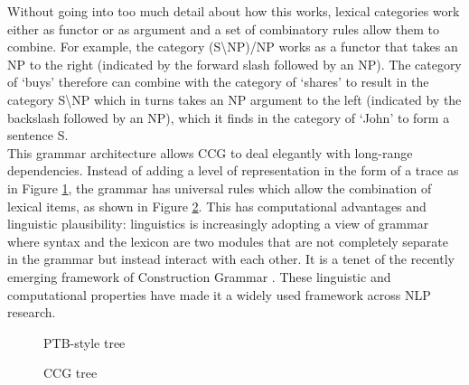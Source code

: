 \documentclass[output=paper]{LSP/langsci}
\begin{document}
\indent Without going into too much detail about how this works, lexical categories work either as functor or as argument and a set of combinatory rules allow them to combine. For example, the category (S\textbackslash NP)/NP works as a functor that takes an NP to the right (indicated by the forward slash followed by an NP). The category of `buys' therefore can combine with the category of `shares' to result in the category S\textbackslash NP which in turns takes an NP argument to the left (indicated by the backslash followed by an NP), which it finds in the category of `John' to form a sentence S.\\
\indent This grammar architecture allows CCG to deal elegantly with long-range dependencies. Instead of adding a level of representation in the form of a trace as in Figure \ref{fig:3}, the grammar has universal rules which allow the combination of lexical items, as shown in Figure \ref{fig:4}. This has computational advantages and linguistic plausibility: linguistics is increasingly adopting a view of grammar where syntax and the lexicon are two modules that are not completely separate in the grammar but instead interact with each other. It is a tenet of the recently emerging framework of Construction Grammar \citep{hoffmann2013}. These linguistic and computational properties have made it a widely used framework across NLP research.
\begin{figure}[H]
\caption{PTB-style tree\label{fig:3}}
\end{figure}

\begin{figure}[H]
\caption{CCG tree\label{fig:4}} 
\end{figure}
\end{document}
